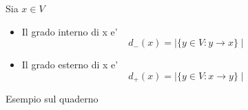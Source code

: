 \documentclass{article}
\begin{document}
        \begin{flushleft}
          Sia $x\in V$
        \end{flushleft}
        \begin{itemize}
          \item Il grado interno di x e'
            \begin{equation*}
              d_-(x)=\mid \{ y\in V:y \to x\} \mid
            \end{equation*}
          \item Il grado esterno di x e'
            \begin{equation*}
              d_+(x)=\mid \{y\in V:x\to y\} \mid
            \end{equation*}
        \end{itemize}
        \begin{flushleft}
          Esempio sul quaderno
        \end{flushleft}
        


      
\end{document}
